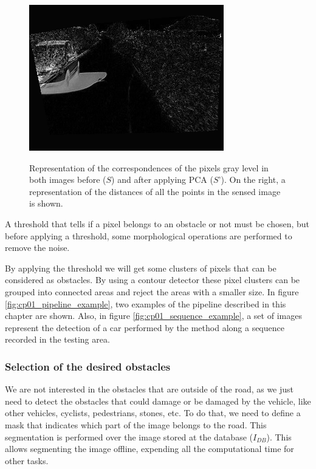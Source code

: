 \begin{figure}[h!]
\begin{minipage}{0.3\textwidth}
\end{minipage}
\begin{minipage}{0.3\textwidth}
    \centering
    \includegraphics[width=\textwidth]{pca3}\label{fig:cp01_pca3}
\end{minipage}
\caption{Representation of the correspondences of the pixels gray level in both images before ($S$) and after applying PCA ($S’$). On the right, a representation of the distances of all the points in the sensed image is shown.}\label{fig:cp01_pca}
\end{figure}

A threshold that tells if a pixel belongs to an obstacle or not must be chosen, but before applying a threshold, some morphological operations are performed to remove the noise.

By applying the threshold we will get some clusters of pixels that can be considered as obstacles. By using a contour detector these pixel clusters can be grouped into connected areas and reject the areas with a smaller size. In figure \ref{fig:cp01_pipeline_example}, two examples of the pipeline described in this chapter are shown. Also, in figure \ref{fig:cp01_sequence_example}, a set of images represent the detection of a car performed by the method along a sequence recorded in the testing area.

\subsubsection{Selection of the desired obstacles}\label{ch:chapter01_01_03_03}

We are not interested in the obstacles that are outside of the road, as we just need to detect the obstacles that could damage or be damaged by the vehicle, like other vehicles, cyclists, pedestrians, stones, etc. To do that, we need to define a mask that indicates which part of the image belongs to the road. This segmentation is performed over the image stored at the database ($I_{DB}$). This allows segmenting the image offline, expending all the computational time for other tasks.

